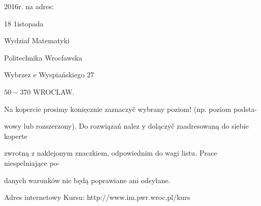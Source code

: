 \documentclass[a4paper,12pt]{article}
\begin{document}
2016r. na adres:

18 1istopada

Wydziaf Matematyki

Politechnika Wrocfawska

Wybrzez $\mathrm{e}$ Wyspiańskiego 27

$50-370$ WROCLAW.

Na kopercie prosimy $\underline{\mathrm{k}\mathrm{o}\mathrm{n}\mathrm{i}\mathrm{e}\mathrm{c}\mathrm{z}\mathrm{n}\mathrm{i}\mathrm{e}}$ zaznaczyč wybrany poziom! (np. poziom podsta-

wowy lub rozszerzony). Do rozwiązań nalez $\mathrm{y}$ dolączyč zaadresowaną do siebie koperte

zwrotną $\mathrm{z}$ naklejonym znaczkiem, odpowiednim do wagi listu. Prace niespelniające po-

danych warunków nie będą poprawiane ani odsyłane.

Adres internetowy Kursu: http://www.im.pwr.wroc.pl/kurs
\end{document}
